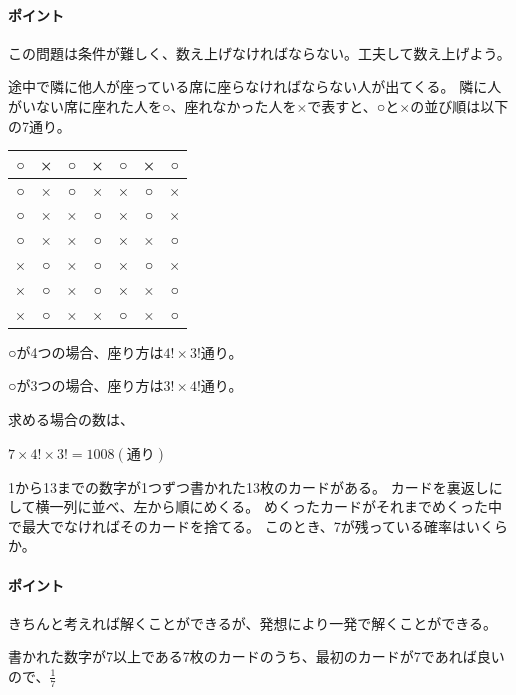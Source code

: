 \documentclass[uplatex,dvipdfmx]{jsbook}
\begin{document}
\paragraph{ポイント}この問題は条件が難しく、数え上げなければならない。工夫して数え上げよう。

\begin{answer}
    途中で隣に他人が座っている席に座らなければならない人が出てくる。
    隣に人がいない席に座れた人を○、座れなかった人を×で表すと、○と×の並び順は以下の7通り。

    \begin{tabular}{|ccccccc|}
        \hline
        ○ & × & ○ & × & ○ & × & ○\\\hline
        ○ & × & ○ & × & × & ○ & ×\\\hline
        ○ & × & × & ○ & × & ○ & ×\\\hline
        ○ & × & × & ○ & × & × & ○\\\hline
        × & ○ & × & ○ & × & ○ & ×\\\hline
        × & ○ & × & ○ & × & × & ○\\\hline
        × & ○ & × & × & ○ & × & ○\\\hline
    \end{tabular}

    ○が4つの場合、座り方は$4!\times 3!$通り。

    ○が3つの場合、座り方は$3!\times 4!$通り。

    求める場合の数は、

    $7\times 4!\times 3!=1008(通り)$
\end{answer}

\begin{problem}[練習問題2]
    1から13までの数字が1つずつ書かれた13枚のカードがある。
    カードを裏返しにして横一列に並べ、左から順にめくる。
    めくったカードがそれまでめくった中で最大でなければそのカードを捨てる。
    このとき、7が残っている確率はいくらか。
\end{problem}

\paragraph{ポイント}きちんと考えれば解くことができるが、発想により一発で解くことができる。

\begin{answer}
    書かれた数字が7以上である7枚のカードのうち、最初のカードが7であれば良いので、$\displaystyle\frac{1}{7}$
\end{answer}
\end{document}
